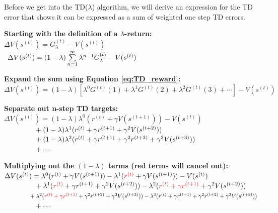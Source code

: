 \documentclass[11pt]{article}
\begin{document}
Before we get into the TD($\lambda$) algorithm, we will derive an expression for the TD error that shows it can be expressed as a sum of weighted one step TD errors.

\begin{large}
    \textbf{Starting with the definition of a $\lambda$-return:}\\\vspace{1mm}
    $\Delta V(s^{(t)}) = G_{\lambda}^{(t)} - V(s^{(t)})$\\
    $\null\;\,\Delta V(s^{(t)}) = (1 - \lambda) \sum\limits_{n=1}^{\infty} \lambda^{n-1} G_{\lambda}^{(t)} - V(s^{(t)})$
    
    \textbf{Expand the sum using Equation \ref{eq:TD_reward}:}\\\vspace{1mm}
    $\Delta V(s^{(t)}) = (1 - \lambda) [\lambda^0 G^{(t)}(1) + \lambda^1 G^{(t)}(2) + \lambda^2 G^{(t)}(3)+\cdots] - V(s^{(t)})$
    
    \textbf{Separate out n-step TD targets:}\\\vspace{1mm}
    $\Delta V(s^{(t)}) = (1 - \lambda) \lambda^0 (r^{(t)} + \gamma V(s^{(t+1)})) - V(s^{(t)})$\\
    $\null \hspace{15mm} + (1 - \lambda) \lambda^1 (r^{(t)} + \gamma r^{(t+1)} + \gamma^2 V(s^{(t+2)}))$\\
    $\null \hspace{15mm} + (1 - \lambda) \lambda^2 (r^{(t)} + \gamma r^{(t+1)} + \gamma^2 r^{(t+2)} + \gamma^3 V(s^{(t+3)}))$\\
    $\null \hspace{15mm} + \cdots$
    
    \textbf{Multiplying out the $(1-\lambda)$ terms (red terms will cancel out):}\\\vspace{1mm}
    $\Delta V(s^{(t)}) = \lambda^0 (r^{(t)} + \gamma V(s^{(t+1)})) - \lambda^1 (\textcolor{red}{r^{(t)}} + \gamma V(s^{(t+1)})) - V(s^{(t)})$\\
    $\null \hspace{15mm} + \lambda^1 (\textcolor{red}{r^{(t)}} + \gamma r^{(t+1)} + \gamma^2 V(s^{(t+2)})) - \lambda^2 (\textcolor{red}{r^{(t)} + \gamma r^{(t+1)}} + \gamma^2 V(s^{(t+2)}))$\\
    $\null \hspace{15mm} + \lambda^2 (\textcolor{red}{r^{(t)} + \gamma r^{(t+1)}} + \gamma^2 r^{(t+2)} + \gamma^3 V(s^{(t+3)})) - \lambda^3 (r^{(t)} + \gamma r^{(t+1)} + \gamma^2 r^{(t+2)} + \gamma^3 V(s^{(t+3)}))$\\
    $\null \hspace{15mm} + \cdots$
    

\end{large}
\end{document}
